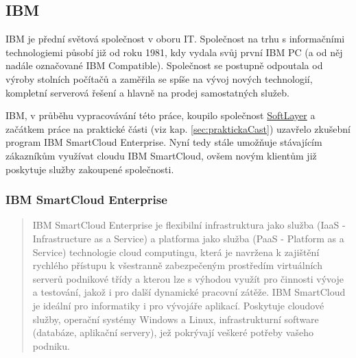 \subsection{IBM}
IBM je přední světová společnost v oboru IT. Společnost na trhu s informačními technologiemi působí již od roku 1981, kdy vydala svůj první IBM PC (a od něj nadále označované IBM Compatible). Společnost se postupně odpoutala od výroby stolních počítačů a zaměřila se spíše na vývoj nových technologií, kompletní serverová řešení a hlavně na prodej samostatných služeb.

IBM, v průběhu vypracovávání této práce, koupilo společnost \href{http://www.softlayer.com/}{SoftLayer} a začátkem práce na praktické části (viz kap. \ref{sec:praktickaCast}) uzavřelo zkušební program IBM SmartCloud Enterprise. Nyní tedy stále umožňuje stávajícím zákazníkům využívat cloudu IBM SmartCloud, ovšem novým klientům již poskytuje služby zakoupené společnosti.\cite{zive:ibmKupujeSoftLayer}

\subsubsection{IBM SmartCloud Enterprise}
\begin{quote}
IBM SmartCloud Enterprise je flexibilní infrastruktura jako služba (IaaS - Infrastructure as a Service) a platforma jako služba (PaaS - Platform as a Service) technologie cloud computingu, která je navržena k zajištění rychlého přístupu k všestranně zabezpečeným prostředím virtuálních serverů podnikové třídy a kterou lze s výhodou využít pro činnosti vývoje a testování, jakož i pro další dynamické pracovní zátěže. IBM SmartCloud je ideální pro informatiky i pro vývojáře aplikací. Poskytuje cloudové služby, operační systémy Windows a Linux, infrastrukturní software (databáze, aplikační servery), jež pokrývají veškeré potřeby vašeho podniku.\cite{ibm:smartCloudEnt}
\end{quote}

